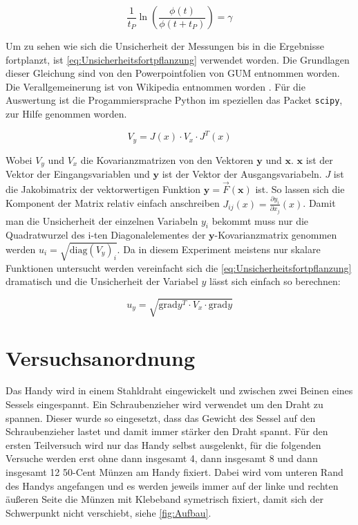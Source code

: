 \documentclass[11pt,ngerman]{scrartcl}
\begin{document}
\begin{equation}
    \frac{1}{t_P} \ln{(\frac{\phi(t)}{\phi(t+t_P)})} = \gamma \label{eq:gamma}
\end{equation}

Um zu sehen wie sich die Unsicherheit der Messungen bis in die Ergebnisse 
fortplanzt, ist \autoref{eq:Unsicherheitsfortpflanzung} verwendet worden.
Die Grundlagen dieser Gleichung sind von den Powerpointfolien von 
GUM entnommen worden.\cite{WolfgangKessel2004} Die Verallgemeinerung ist von Wikipedia entnommen
worden \cite{2020Fehler}.
Für die Auswertung ist die Progammiersprache Python im speziellen das 
Packet \verb#scipy#, zur Hilfe genommen worden.

\begin{equation}
    \label{eq:Unsicherheitsfortpflanzung}
    V_y = J(x) \cdot V_x \cdot J^{T}(x)
\end{equation}

Wobei $V_y$ und $V_x$ die Kovarianzmatrizen von den Vektoren $\bm{y}$ und $\bm{x}$.
$\bm{x}$ ist der Vektor der Eingangsvariablen und $\bm{y}$ ist der Vektor der Ausgangsvariabeln.
$J$ ist die Jakobimatrix der vektorwertigen Funktion $\bm{y} = \vec{F}(\bm{x})$ ist.
So lassen sich die Komponent der Matrix relativ einfach anschreiben $J_{ij}(x) = \frac{\partial{y_i}}{\partial{x_j}}(x)$.
Damit man die Unsicherheit der einzelnen Variabeln $y_i$ bekommt muss nur die Quadratwurzel des i-ten Diagonalelementes der 
$\bm{y}$-Kovarianzmatrix genommen werden $u_i= \sqrt{\mathrm{diag}(V_y)_i}$.
Da in diesem Experiment meistens nur skalare Funktionen untersucht werden vereinfacht
sich die \autoref{eq:Unsicherheitsfortpflanzung} dramatisch und die Unsicherheit
der Variabel $y$ lässt sich einfach so berechnen:

\begin{equation}
    \label{eq:graduncentainty}
    u_y = \sqrt{\mathrm{grad} y^T \cdot V_x \cdot \mathrm{grad} y}
\end{equation}

\section{Versuchsanordnung}
\label{sec:versuchsanordnung}

Das Handy wird in einem Stahldraht eingewickelt und zwischen zwei Beinen eines
Sessels eingespannt. Ein Schraubenzieher wird verwendet um den Draht zu
spannen.  Dieser wurde so eingesetzt, dass das Gewicht des Sessel auf den
Schraubenzieher lastet und damit immer stärker den Draht spannt. Für den ersten
Teilversuch wird nur das Handy selbst ausgelenkt, für die folgenden Versuche
werden erst ohne dann insgesamt 4, dann insgesamt 8 und dann insgesamt 12
50-Cent Münzen am Handy fixiert. Dabei wird vom unteren Rand des Handys
angefangen und es werden jeweils immer auf der linke und rechten äußeren Seite
die Münzen mit Klebeband symetrisch fixiert, damit sich der Schwerpunkt nicht
verschiebt, siehe \autoref{fig:Aufbau}.
\end{document}
